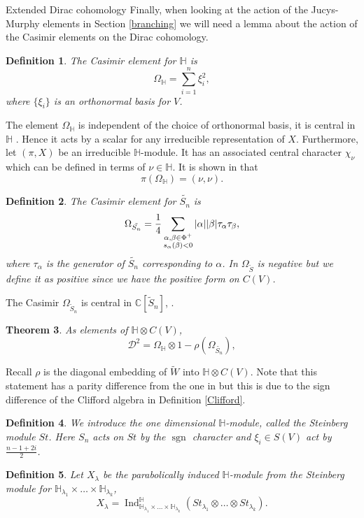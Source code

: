 \documentclass[a4paper,10pt]{amsart}
\newtheorem{theorem}{Theorem}[section]
\newtheorem{definition}[theorem]{Definition}
\DeclareMathOperator{\sgn}{sgn}
\DeclareMathOperator{\Ind}{Ind}
\begin{document}
\begin{section}{Extended Dirac cohomology}
 Finally, when looking at the action of the Jucys-Murphy elements in Section \ref{branching} we will need a lemma about the action of the Casimir elements on the Dirac cohomology. 
 
 \begin{definition} The Casimir element for $\mathbb{H}$ is 
 $$\Omega_\mathbb{H} = \sum_{i=1}^n \xi_i^2,$$
 where $\{\xi_i\}$ is an orthonormal basis for $V$. \end{definition}
 The element $\Omega_{\mathbb{H}}$ is independent of the choice of orthonormal basis, it is central in $\mathbb{H}$ \cite[2.4]{BCT12}. Hence it acts by a scalar for any irreducible representation of $X$. Furthermore, let $(\pi,X)$ be an irreducible $\mathbb{H}$-module. It has an associated central character $\chi_\nu$ which can be defined in terms of $\nu \in \mathbb{H}$. It is shown in \cite[2.5]{BCT12} that $$\pi(\Omega_{\mathbb{H}})= ( \nu , \nu ).$$ 

 \begin{definition}\cite[3.4]{BCT12}The Casimir element for $\tilde{S_n}$ is 
 $$\Omega_{\tilde{S_n}} = \frac{1}{4}\sum_{\begin{substack}{\alpha, \beta \in \Phi^+\\ s_\alpha(\beta) < 0} \end{substack}} |\alpha||\beta| \tau_\alpha \tau_\beta,$$
 where $\tau_\alpha$ is the generator of $\tilde{S_n}$ corresponding to $\alpha$.
 In \cite{BCT12} $\Omega_{\tilde{S}}$ is negative but we define it as positive since we have the positive form on $C(V)$. \end{definition} 
 The Casimir $\Omega_{\tilde{S}_n}$ is central in $\mathbb{C}[\tilde{S}_n]$, \cite{BCT12}. 
  
 \begin{theorem}\label{Dirac}\cite[3.5]{BCT12} As elements of $\mathbb{H}\otimes C(V)$,
  $$\mathcal{D}^2 =  \Omega_\mathbb{H}\otimes 1- \rho(\Omega_{\tilde{S_n}}),$$
 \end{theorem} 
Recall $\rho$ is the diagonal embedding of $\tilde{W}$ into $\mathbb{H}\otimes C(V)$. 
 Note that this statement has a parity difference from the one in \cite{BCT12} but this is due to the sign difference of the Clifford algebra in Definition \ref{Clifford}. 

\begin{definition} \label{Steinberg}\cite{Ci16} We introduce the one dimensional $\mathbb{H}$-module, called the Steinberg module $St$. Here $S_n$ acts on $St$ by the $\sgn$ character and $\xi_i\in S(V)$ act by $\frac{n-1 + 2i}{2}$. %
\end{definition} 
\begin{definition} Let $X_\lambda$ be the parabolically induced $\mathbb{H}$-module from the Steinberg module for $\mathbb{H}_{\lambda_1}\times \ldots \times \mathbb{H}_{\lambda_k}$,
$$X_\lambda = \Ind_{\mathbb{H}_{\lambda_1}\times \ldots \times \mathbb{H}_{\lambda_k}}^\mathbb{H} (St_{\lambda_1} \otimes \ldots \otimes St_{\lambda_k}).$$ \end{definition}




\end{section}
\end{document}
